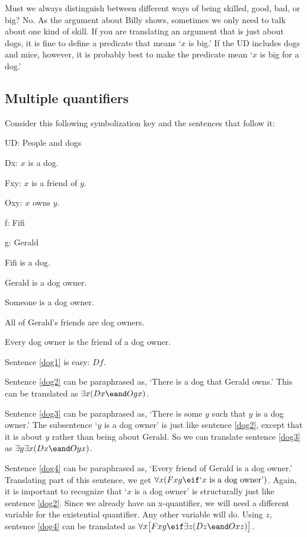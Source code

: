 Must we always distinguish between different ways of being skilled, good, bad, or big? No. As the argument about Billy shows, sometimes we only need to talk about one kind of skill. If you are translating an argument that is just about dogs, it is fine to define a predicate that means `$x$ is big.' If the UD includes dogs and mice, however, it is probably best to make the predicate mean `$x$ is big for a dog.'


\subsection{Multiple quantifiers}
Consider this following symbolization key and the sentences that follow it:
\begin{ekey}
\item{UD:} People and dogs
\item{Dx:} $x$ is a dog.
\item{Fxy:} $x$ is a friend of $y$.
\item{Oxy:} $x$ owns $y$.
\item{f:} Fifi
\item{g:} Gerald
\end{ekey}

\begin{earg}
\item[\ex{dog1}] Fifi is a dog.
\item[\ex{dog2}] Gerald is a dog owner.
\item[\ex{dog3}] Someone is a dog owner.
\item[\ex{dog4}] All of Gerald's friends are dog owners.
\item[\ex{dog5}] Every dog owner is the friend of a dog owner.
\end{earg}

Sentence \ref{dog1} is easy: $Df$.

Sentence \ref{dog2} can be paraphrased as, `There is a dog that Gerald owns.' This can be translated as $\exists x(Dx \eand Ogx)$.

Sentence \ref{dog3} can be paraphrased as, `There is some $y$ such that $y$ is a dog owner.' The subsentence `$y$ is a dog owner' is just like sentence \ref{dog2}, except that it is about $y$ rather than being about Gerald. So we can translate sentence \ref{dog3} as $\exists y \exists x(Dx \eand Oyx)$. 

Sentence \ref{dog4} can be paraphrased as, `Every friend of Gerald is a dog owner.' Translating part of this sentence, we get $\forall x(Fxg \eif\mbox{`$x$ is a dog owner'})$. Again, it is important to recognize that `$x$ is a dog owner' is structurally just like sentence \ref{dog2}. Since we already have an x-quantifier, we will need a different variable for the existential quantifier. Any other variable will do. Using $z$, sentence \ref{dog4} can be translated as $\forall x\bigl[Fxg \eif\exists z(Dz \eand Oxz)\bigr]$.

